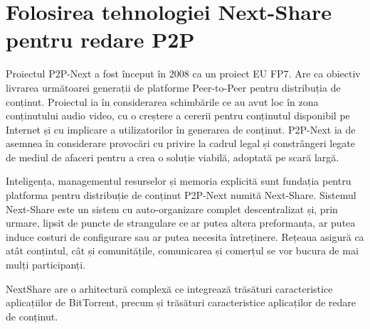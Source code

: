 \section{Folosirea tehnologiei Next-Share pentru redare P2P}
\label{sec:multimedia-dist:nextshare}

Proiectul P2P-Next a fost început în 2008 ca un proiect EU FP7. Are ca obiectiv
livrarea următoarei generații de platforme Peer-to-Peer pentru distribuția de
conținut. Proiectul ia în considerarea schimbările ce au avut loc în zona
conținutului audio video, cu o creștere a cererii pentru conținutul disponibil
pe Internet și cu implicare a utilizatorilor în generarea de conținut.
P2P-Next ia de asemnea în considerare provocări cu privire la cadrul legal și
constrângeri legate de mediul de afaceri pentru a crea o soluție viabilă,
adoptată pe scară largă.

Inteligența, managementul resurselor și memoria explicită sunt fundația pentru
platforma pentru distribuție de conținut P2P-Next numită Next-Share. Sistemul
Next-Share este un sistem cu auto-organizare complet descentralizat și, prin
urmare, lipsit de puncte de strangulare ce ar putea altera preformanța, ar
putea induce costuri de configurare sau ar putea necesita întreținere.
Rețeaua asigură ca atât conțintul, cât și comunitățile, comunicarea și
comerțul se vor bucura de mai mulți participanți.

NextShare are o arhitectură complexă ce integrează trăsături caracteristice
aplicațiilor de BitTorrent, precum și trăsături caracteristice aplicaților de
redare de conținut.

